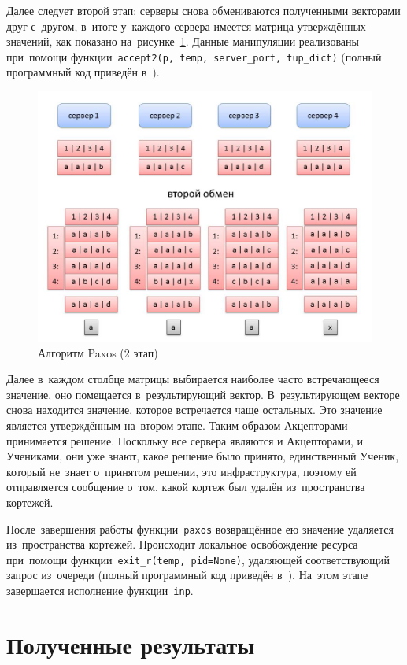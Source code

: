 Далее следует второй этап: серверы снова обмениваются полученными векторами друг с~другом, в~итоге у~каждого сервера имеется матрица утверждённых значений, как показано на~рисунке~\ref{paxosjpg2}. Данные манипуляции реализованы при~помощи функции~\texttt{accept2(p, temp, server_port, tup_dict)} (полный программный код приведён в~\autocite{mybts}).
\begin{figure}
	\centering \includegraphics[width=0.8 \textwidth, height=0.6 \textwidth]{img/paxos2}  \caption{Алгоритм Paxos (2 этап)} \label{paxosjpg2}
\end{figure}
Далее в~каждом столбце матрицы выбирается наиболее часто встречающееся значение, оно помещается в~результирующий вектор. В~результирующем векторе снова находится значение, которое встречается чаще остальных. Это значение является утверждённым на~втором этапе. Таким образом Акцепторами принимается решение. Поскольку все сервера являются и Акцепторами, и Учениками, они уже знают, какое решение было принято, единственный Ученик, который не~знает о~принятом решении, это инфраструктура, поэтому ей отправляется сообщение о~том, какой кортеж был удалён из~пространства кортежей.

После~завершения работы функции~\texttt{paxos} возвращённое ею значение удаляется из~пространства кортежей. Происходит локальное освобождение ресурса при~помощи функции~\texttt{exit_r(temp, pid=None)}, удаляющей соответствующий запрос из~очереди (полный программный код приведён в~\autocite{mybts}). На~этом этапе завершается исполнение функции~\texttt{inp}.


\section{Полученные результаты}\label{sec:3}

